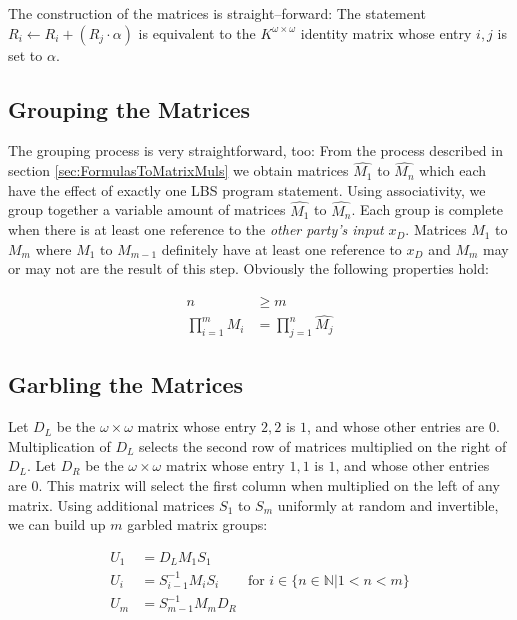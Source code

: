 \documentclass[12pt, a4paper]{article}
\begin{document}
\noindent{}The construction of the matrices is straight--forward: The statement
$R_i \leftarrow R_i + (R_j \cdot \alpha)$ is equivalent to the $K^{\omega \times
\omega}$ identity matrix whose entry $i,j$ is set to $\alpha$.


\subsection{Grouping the Matrices}
\label{sec:matrix-grouping}

The grouping process is very straightforward, too: From the process described in
section \ref{sec:FormulasToMatrixMuls} we obtain matrices $\widehat{M_1}$ to
$\widehat{M_n}$ which each have the effect of exactly one LBS program statement.
Using associativity, we group together a variable amount of matrices
$\widehat{M_1}$ to $\widehat{M_n}$. Each group is complete when there is at
least one reference to the \emph{other party's input} $x_D$.  Matrices $M_1$ to
$M_m$ where $M_1$ to $M_{m-1}$ definitely have at least one reference to $x_D$
and $M_m$ may or may not are the result of this step.  Obviously the following
properties hold:

\begin{align*}
n & \geq m \\
\prod_{i=1}^m M_i & = \prod_{j=1}^n \widehat{M_j}
\end{align*}

\subsection{Garbling the Matrices}
\label{sec:matrix-garbling}

Let $D_L$ be the $\omega \times \omega$ matrix whose entry $2,2$ is $1$, and
whose other entries are $0$. Multiplication of $D_L$ selects the second row of
matrices multiplied on the right of $D_L$. Let $D_R$ be the $\omega \times
\omega$ matrix whose entry $1,1$ is $1$, and whose other entries are $0$. This
matrix will select the first column when multiplied on the left of any matrix.
Using additional matrices $S_1$ to $S_{m}$ uniformly at random and invertible,
we can build up $m$ garbled matrix groups:

\begin{align*}
U_1 & = D_L M_1 S_1 \\
U_i & = S_{i-1}^{-1} M_i S_i &
\text{for $i \in \{n \in \mathbb{N} \big| 1 < n < m\}$}\\
U_m & = S_{m-1}^{-1} M_m D_R
\end{align*}
\end{document}

